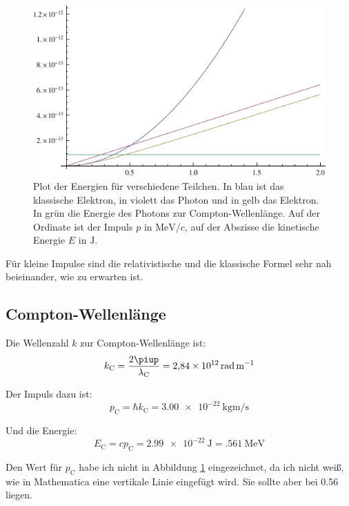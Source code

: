 \begin{figure}
	\centering
	\includegraphics[width=.85\textwidth]{H2-Plot.pdf}
	\caption{%
		Plot der Energien für verschiedene Teilchen. In blau ist das klassische
		Elektron, in violett das Photon und in gelb das Elektron. In grün die
		Energie des Photons zur Compton-Wellenlänge. Auf der Ordinate ist der
		Impuls $p$ in $\si{\mega\electronvolt}/c$, auf der Abszisse die
		kinetische Energie $E$ in $\si\joule$.
	}
	\label{fig:2-mathematica}
\end{figure}

Für kleine Impulse sind die relativistische und die klassische Formel sehr nah
beieinander, wie zu erwarten ist.

\subsection{Compton-Wellenlänge}

Die Wellenzahl $k$ zur Compton-Wellenlänge ist:
\[
	k_\text{C} = \frac{2\piup}{\lambda_\text{C}} = \SI{2.84e12}{\radian\per\meter}
\]

Der Impuls dazu ist:
\[
	p_\text{C} = \hbar k_\text{C} = \SI{3.00e-22}{\kilogram\meter\per\second}
\]

Und die Energie:
\[
	E_\text{C} = cp_\text{C} = \SI{2.99e-22}\joule = \SI{.561}{\mega\electronvolt}
\]

Den Wert für $p_\text{C}$ habe ich nicht in Abbildung \ref{fig:2-mathematica}
eingezeichnet, da ich nicht weiß, wie in Mathematica eine vertikale Linie
eingefügt wird. Sie sollte aber bei \num{.56} liegen.


